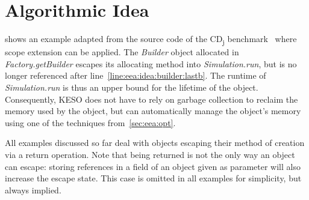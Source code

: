 	\section{Algorithmic Idea}
		\label{sec:eea:idea}

		 shows an example adapted from the source code of the CD\textsubscript{j}
		benchmark~\cite{kalibera:09:jtres} where scope extension can be applied. The \emph{Builder} object allocated in
		\emph{Factory.getBuilder} escapes its allocating method into \emph{Simulation.run}, but is no longer referenced
		after line~\ref{line:eea:idea:builder:lastb}. The runtime of \emph{Simulation.run} is thus an upper bound for the
		lifetime of the object. Consequently, KESO does not have to rely on garbage collection to reclaim the memory used by
		the object, but can automatically manage the object's memory using one of the techniques from~\cref{sec:eea:opt}.


		All examples discussed so far deal with objects escaping their method of creation via a return operation. Note that
		being returned is not the only way an object can escape: storing references in a field of an object given as
		parameter will also increase the escape state. This case is omitted in all examples for simplicity, but always
		implied.

